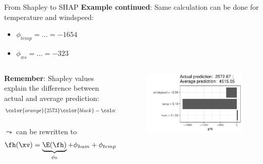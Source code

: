 \documentclass[11pt,compress,t,notes=noshow, aspectratio=169, xcolor=table]{beamer}
\begin{document}
\begin{frame}{From Shapley to SHAP}
\textbf{Example continued}: Same calculation can be done for temperature and windspeed:
\begin{itemize}
    \item $\phi_{temp} = \ldots = -1654$
    \item $\phi_{ws} = \ldots = -323$
\end{itemize}

\begin{columns}[T]
\begin{column}{0.5\textwidth}
\textbf{Remember}: Shapley values explain the difference between actual and average prediction:
\begin{eqnarray*}
\color{orange}{2573} \color{black}- \color{blue}{4515} \color{black} = &34 - 1654 - 323 &= - 1942\\
\fh(\xv) - \E(\fh) =& \phi_{hum} + \phi_{temp} + \phi_{ws}&\\
\end{eqnarray*}
$\leadsto$ can be rewritten to
$$
\fh(\xv) = \underbrace{\E(\fh)}_{\phi_0} + \phi_{hum} + \phi_{temp} + \phi_{ws}
$$
\end{column}
\begin{column}{0.5\textwidth}
\begin{figure}
    \centering
    \includegraphics[width=0.9\columnwidth]{figure/shapley2shap.pdf}
\end{figure}
\end{column}
\end{columns}
\end{frame}
\end{document}
